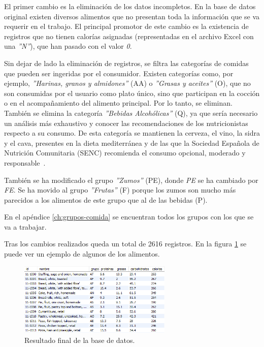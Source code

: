El primer cambio es la eliminación de los datos incompletos. En la base de datos original existen diversos alimentos que no presentan toda la información que se va requerir en el trabajo. El principal promotor de este cambio es la existencia de registros que no tienen calorías asignadas (representadas en el archivo Excel con una \textit{''N''}), que han pasado con el valor \textit{0}.

Sin dejar de lado la eliminación de registros, se filtra las categorías de comidas que pueden ser ingeridas por el consumidor. Existen categorías como, por ejemplo, \textit{''Harinas, granos y almidones''} (AA) o \textit{''Grasas y aceites''} (O), que no son consumidas por el usuario como plato único, sino que participan en la cocción o en el acompañamiento del alimento principal. Por lo tanto, se eliminan. También se elimina la categoría \textit{''Bebidas Alcohólicas''} (Q), ya que sería necesario un análisis más exhaustivo y conocer las recomendaciones de los nutricionistas respecto a su consumo. De esta categoría se mantienen la cerveza, el vino, la sidra y el cava, presentes en la dieta mediterránea y de las que la Sociedad Española de Nutrición Comunitaria (SENC) recomienda el consumo opcional, moderado y responsable~\cite{senpiramide}.

También se ha modificado el grupo \textit{''Zumos''} (PE), donde \textit{PE} se ha cambiado por \textit{FE}. Se ha movido al grupo \textit{''Frutas''} (F) porque los zumos son mucho más parecidos a los alimentos de este grupo que al de las bebidas (P).

En el apéndice \ref{ch:grupos-comida} se encuentran todos los grupos con los que se va a trabajar.

Tras los cambios realizados queda un total de 2616 registros. En la figura \ref{fig:ejemplo} se puede ver un ejemplo de algunos de los alimentos.

\begin{figure}[H]
    \centering
    \includegraphics[width=0.65\textwidth]{figures/ejemplo.png}
    \caption{Resultado final de la base de datos.}
    \label{fig:ejemplo}
\end{figure}

